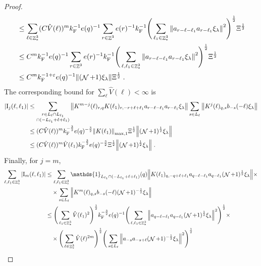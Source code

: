 \documentclass[12pt,a4paper]{article}
\numberwithin{equation}{section}
\newcommand{\1}{\mathbb{I}}
\newcommand{\F}{\mathrm{F}}
\newcommand{\I}{\mathrm{I}}
\DeclareMathOperator{\Z}{\mathbb{Z}}
\DeclareMathOperator{\NN}{\mathcal{N}}
\newcommand{\half}{\frac{1}{2}}
\theoremstyle{plain}
\theoremstyle{definition}
\theoremstyle{remark}
\theoremstyle{plain}
\theoremstyle{definition}
\theoremstyle{remark}
\begin{document}
\begin{proof}
{\begin{align}
	&\leq \sum_{\ell \in \Z^3_*} (C \hat{V}(\ell))^m k_{\F}^{-1} e(q)^{-1}
		\sum_{r \in \Z^3} e(r)^{-1} k_{\F}^{-1}
		\Bigg( \sum_{\ell_1 \in \Z^3_*} \norm{ a_{r-\ell-\ell_1} a_{r-\ell_1} \xi_\lambda}^2 \Bigg)^{\half}
		\Xi^\half \nonumber\\
	&\leq C^m k_{\F}^{-1} e(q)^{-1}
		\sum_{r \in \Z^3} e(r)^{-1} k_{\F}^{-1}
		\Bigg( \sum_{\ell,\ell_1 \in \Z^3_*} \norm{ a_{r-\ell-\ell_1} a_{r-\ell_1} \xi_\lambda}^2 \Bigg)^{\half}
		\Xi^\half \nonumber\\
	&\leq C^m k_{\F}^{-1+\varepsilon} e(q)^{-1}
		\norm{ (\NN+1) \xi_\lambda}
		\Xi^\half \;. \label{eq:estEQ2152_Coulomb}
\end{align}
The corresponding bound for $ \sum_\ell \hat{V}(\ell) < \infty $ is}
\begin{align}
	|\I_j(\ell, \ell_1)|
	&\leq \sum\limits_{\substack{r\in L_{\ell} \cap L_{\ell_1}\\ \cap (-L_{\ell_1}+\ell+\ell_1)}}
		\norm{ K^{m-j}(\ell)_{r,q} K(\ell_1)_{r,-r+\ell+\ell_1} a_{r-\ell-\ell_1} a_{r-\ell_1} \xi_\lambda}
		\sum\limits_{s \in L_{\ell}}
		\norm{ K^j(\ell)_{q,s} b_{-s}(-\ell) \xi_\lambda }\nonumber\\
	&\leq (C \hat{V}(\ell))^m k_{\F}^{-\frac 32} e(q)^{-\frac 32}
		\norm{K(\ell_1)}_{\max,1} \Xi^{\half}
		\norm{ (\NN+1)^\half \xi_\lambda} \nonumber\\
	&\leq (C \hat{V}(\ell))^m
		\hat{V}(\ell_1)
		k_{\F}^{-\frac 32} e(q)^{-\frac 32} \Xi^\half
		\norm{ (\NN+1)^\half \xi_\lambda} \;. \label{eq:estEQ2152}
\end{align}
Finally, for $ j = m $,
\textcolor{green!30!black}{
\begin{align}
	\sum_{\ell,\ell_1 \in \Z^3_*} |\I_m(\ell, \ell_1)|
	&\leq \sum_{\ell,\ell_1 \in \Z^3_*} \mathds{1}_{L_{\ell_1} \cap (-L_{\ell_1} + \ell + \ell_1)}(q) \norm{K(\ell_1)_{q,-q+\ell+\ell_1} a_{q-\ell-\ell_1} a_{q-\ell_1} (\NN+1)^{\half} \xi_\lambda} \times \nonumber\\
	&\quad \times \sum\limits_{ s \in L_{\ell}}
		\norm{ K^m(\ell)_{q,s} b_{-s}(-\ell) (\NN+1)^{-\half} \xi_\lambda }\nonumber\\
	&\leq \Bigg( \sum_{\ell_1 \in \Z^3_*} \hat{V}(\ell_1)^2 \Bigg)^{\half} 
		k_{\F}^{-\frac 32} e(q)^{-1}
		\Bigg( \sum_{\ell,\ell_1 \in \Z^3_*} \norm{a_{q-\ell-\ell_1} a_{q-\ell_1} (\NN+1)^{\half} \xi_\lambda}^2 \Bigg)^{\half} \times \nonumber\\
	&\quad \times \Bigg( \sum_{\ell \in \Z^3_*} \hat{V}(\ell)^{2m} \Bigg)^{\half} 
		\Bigg( \sum\limits_{ s \in L_{\ell}} \norm{ a_{-s} a_{-s+\ell} (\NN+1)^{-\half} \xi_\lambda }^2 \Bigg)^{\half} \nonumber\\

\end{align}}
\end{proof}
\end{document}
